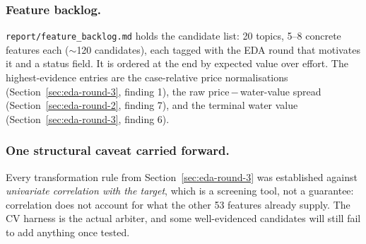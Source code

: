 

\subsubsection*{Feature backlog.} \texttt{report/feature\_backlog.md} holds the candidate list:
20 topics, 5--8 concrete features each ($\sim$120 candidates), each tagged with the EDA round that
motivates it and a status field. It is ordered at the end by expected value over effort. The
highest-evidence entries are the case-relative price normalisations
(Section~\ref{sec:eda-round-3}, finding 1), the raw price\,$-$\,water-value spread
(Section~\ref{sec:eda-round-2}, finding 7), and the terminal water value
(Section~\ref{sec:eda-round-3}, finding 6).

\subsubsection*{One structural caveat carried forward.} Every transformation rule from
Section~\ref{sec:eda-round-3} was established against \emph{univariate correlation with the
target}, which is a screening tool, not a guarantee: correlation does not account for what the
other 53 features already supply. The CV harness is the actual arbiter, and some
well-evidenced candidates will still fail to add anything once tested.

